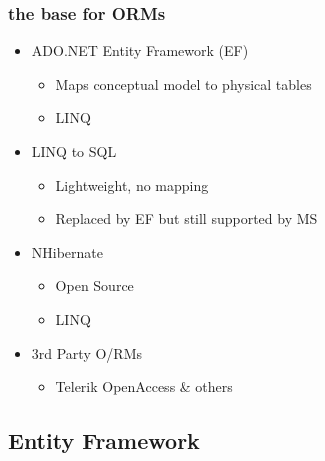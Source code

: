 \documentclass[10pt]{article}
\begin{document}
\subsubsection{the base for ORMs}
\begin{itemize}
	\item ADO.NET Entity Framework (EF)
	 \begin{itemize}
	 	\item Maps conceptual model to physical tables
	 	\item LINQ
	 \end{itemize}
	 \item LINQ to SQL
	 \begin{itemize}
	 	\item Lightweight, no mapping
	 	\item Replaced by EF but still supported by MS
	 \end{itemize}
	 \item NHibernate
	 \begin{itemize}
	 	\item Open Source
	 	\item LINQ
	 \end{itemize}
	 \item 3rd Party O/RMs
	 \begin{itemize}
	 	\item Telerik OpenAccess \& others
	 \end{itemize}
\end{itemize}
\subsection{Entity Framework}
\end{document}
